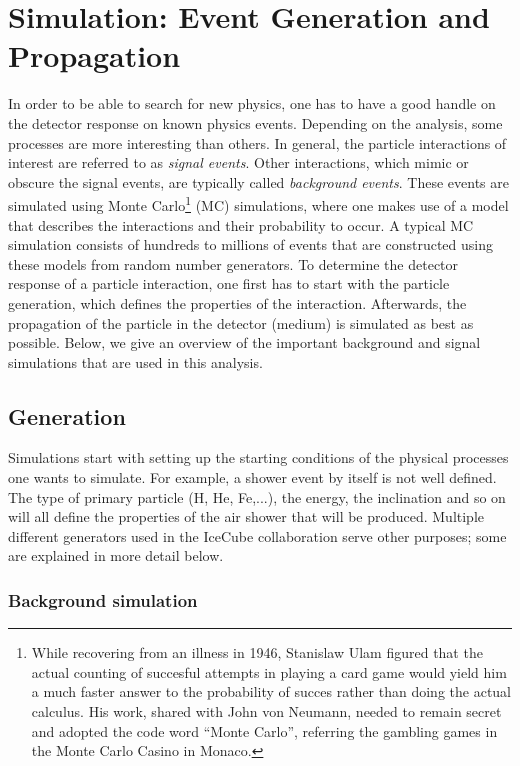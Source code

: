 \chapter{Simulation: Event Generation and Propagation}
In order to be able to search for new physics, one has to have a good handle on the detector response on known physics events. Depending on the analysis, some processes are more interesting than others. In general, the particle interactions of interest are referred to as \textit{signal events}. Other interactions, which mimic or obscure the signal events, are typically called \textit{background events}. These events are simulated using Monte Carlo\footnote{While recovering from an illness in 1946, Stanislaw Ulam figured that the actual counting of succesful attempts in playing a card game would yield him a much faster answer to the probability of succes rather than doing the actual calculus. His work, shared with John von Neumann, needed to remain secret and adopted the code word ``Monte Carlo'', referring the gambling games in the Monte Carlo Casino in Monaco.} (MC) simulations, where one makes use of a model that describes the interactions and their probability to occur. A typical MC simulation consists of hundreds to millions of events that are constructed using these models from random number generators. To determine the detector response of a particle interaction, one first has to start with the particle generation, which defines the properties of the interaction. Afterwards, the propagation of the particle in the detector (medium) is simulated as best as possible. Below, we give an overview of the important background and signal simulations that are used in this analysis.
\section{Generation}
Simulations start with setting up the starting conditions of the physical processes one wants to simulate. For example, a shower event by itself is not well defined. The type of primary particle (H, He, Fe,...), the energy, the inclination and so on will all define the properties of the air shower that will be produced. Multiple different generators used in the IceCube collaboration serve other purposes; some are explained in more detail below.

\subsection{Background simulation}
